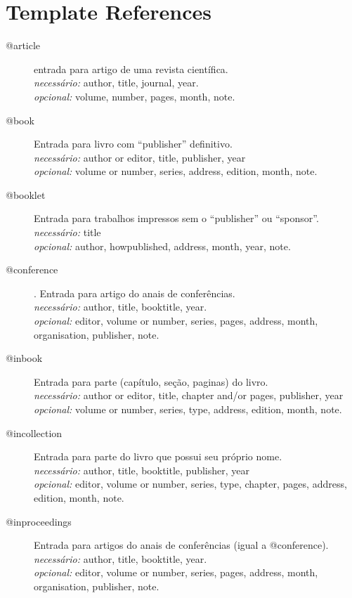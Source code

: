 \section{Template References}
\begin{description}
\item [@article] entrada para artigo de uma revista científica.  \\
    \textit{necessário:} author, title, journal, year. \\
    \textit{opcional:} volume, number, pages, month, note.
\item [@book] Entrada para livro com ``publisher'' definitivo. \\
    \textit{necessário:} author or editor, title, publisher, year \\
    \textit{opcional:} volume or number, series, address, edition, month, note.

\item [@booklet] Entrada para trabalhos impressos sem o ``publisher'' 
    ou ``sponsor''. \\
    \textit{necessário:} title \\
    \textit{opcional:} author, howpublished, address, month, year, note.

\item [@conference]. Entrada para artigo do anais de conferências. \\
    \textit{necessário:} author, title, booktitle, year. \\
    \textit{opcional:} editor, volume or number, series, pages, address,
      month, organisation, publisher, note.
    
\item [@inbook] Entrada para parte (capítulo, seção, paginas) do livro. \\
    \textit{necessário:} author or editor, title, chapter and/or pages,
       publisher, year \\
    \textit{opcional:} volume or number, series, type, address, edition, 
       month, note.

\item [@incollection] Entrada para parte do livro que possui seu próprio nome. \\
    \textit{necessário:} author, title, booktitle, publisher, year \\
    \textit{opcional:} editor, volume or number, series, type, chapter, 
       pages, address, edition, month, note.

\item [@inproceedings] Entrada para artigos do anais de conferências 
      (igual a @conference). \\
    \textit{necessário:} author, title, booktitle, year. \\
    \textit{opcional:} editor, volume or number, series, pages, address, 
      month, organisation, publisher, note.


\end{description}

